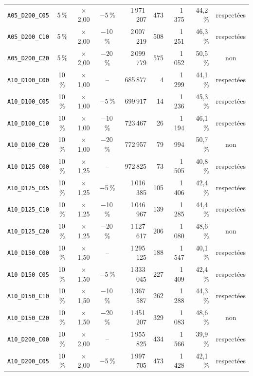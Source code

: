 {\begin{longtable}{lcccrrrrc}
\texttt{A05\_D200\_C05} & 5\,\% & $\times$2{,}00 & $-$5\,\% & 1\,971\,207 & 473 & 1\,375 & 44{,}2\,\% & respectées \\
\texttt{A05\_D200\_C10} & 5\,\% & $\times$2{,}00 & $-$10\,\% & 2\,007\,219 & 508 & 1\,251 & 46{,}3\,\% & respectées \\
\texttt{A05\_D200\_C20} & 5\,\% & $\times$2{,}00 & $-$20\,\% & 2\,099\,779 & 575 & 1\,052 & 50{,}5\,\% & non \\
\texttt{A10\_D100\_C00} & 10\,\% & $\times$1{,}00 & -- & 685\,877 & 4 & 1\,299 & 44{,}1\,\% & respectées \\
\texttt{A10\_D100\_C05} & 10\,\% & $\times$1{,}00 & $-$5\,\% & 699\,917 & 14 & 1\,236 & 45{,}3\,\% & respectées \\
\texttt{A10\_D100\_C10} & 10\,\% & $\times$1{,}00 & $-$10\,\% & 723\,467 & 26 & 1\,194 & 46{,}1\,\% & respectées \\
\texttt{A10\_D100\_C20} & 10\,\% & $\times$1{,}00 & $-$20\,\% & 772\,957 & 79 & 994 & 50{,}7\,\% & non \\
\texttt{A10\_D125\_C00} & 10\,\% & $\times$1{,}25 & -- & 972\,825 & 73 & 1\,505 & 40{,}8\,\% & respectées \\
\texttt{A10\_D125\_C05} & 10\,\% & $\times$1{,}25 & $-$5\,\% & 1\,016\,385 & 105 & 1\,406 & 42{,}4\,\% & respectées \\
\texttt{A10\_D125\_C10} & 10\,\% & $\times$1{,}25 & $-$10\,\% & 1\,046\,967 & 139 & 1\,285 & 44{,}4\,\% & respectées \\
\texttt{A10\_D125\_C20} & 10\,\% & $\times$1{,}25 & $-$20\,\% & 1\,127\,617 & 206 & 1\,080 & 48{,}6\,\% & non \\
\texttt{A10\_D150\_C00} & 10\,\% & $\times$1{,}50 & -- & 1\,295\,125 & 188 & 1\,547 & 40{,}1\,\% & respectées \\
\texttt{A10\_D150\_C05} & 10\,\% & $\times$1{,}50 & $-$5\,\% & 1\,333\,045 & 227 & 1\,409 & 42{,}4\,\% & respectées \\
\texttt{A10\_D150\_C10} & 10\,\% & $\times$1{,}50 & $-$10\,\% & 1\,367\,587 & 262 & 1\,288 & 44{,}3\,\% & respectées \\
\texttt{A10\_D150\_C20} & 10\,\% & $\times$1{,}50 & $-$20\,\% & 1\,451\,207 & 329 & 1\,083 & 48{,}6\,\% & non \\
\texttt{A10\_D200\_C00} & 10\,\% & $\times$2{,}00 & -- & 1\,955\,825 & 434 & 1\,566 & 39{,}9\,\% & respectées \\
\texttt{A10\_D200\_C05} & 10\,\% & $\times$2{,}00 & $-$5\,\% & 1\,997\,705 & 473 & 1\,428 & 42{,}1\,\% & respectées \\

\end{longtable}}

